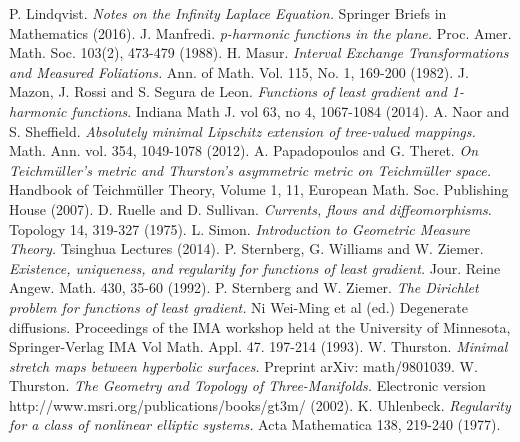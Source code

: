 \documentclass{ip-journal}
\theoremstyle{definition}
\numberwithin{equation}{section}
\begin{document}
\begin{thebibliography}{ABC}
 P. Lindqvist. {\it Notes on the Infinity Laplace Equation.} Springer Briefs in Mathematics (2016).
 J. Manfredi. {\it p-harmonic functions in the plane.} Proc. Amer. Math. Soc. 103(2), 473-479 (1988).
 H. Masur. {\it Interval Exchange Transformations and Measured Foliations.} Ann. of Math. Vol. 115, No. 1,  169-200 (1982).
 J. Mazon, J. Rossi and S. Segura de Leon. {\it Functions of least gradient and 1-harmonic functions}. Indiana Math J. vol 63, no 4, 1067-1084 (2014).
 A. Naor and S. Sheffield. {\it Absolutely minimal Lipschitz extension of tree-valued mappings.} Math. Ann. vol. 354, 1049-1078 (2012).
 A. Papadopoulos and G. Theret. {\it On Teichm\"uller's metric and Thurston's asymmetric metric on Teichm\"uller space.}  Handbook of Teichm\"uller Theory, Volume 1, 11, European Math. Soc. Publishing House (2007).
 D. Ruelle and D. Sullivan. {\it Currents, flows and diffeomorphisms}. Topology 14, 319-327 (1975).
 L. Simon. {\it Introduction to Geometric Measure Theory.} Tsinghua Lectures (2014).
 P. Sternberg, G. Williams and W. Ziemer. {\it Existence, uniqueness, and regularity for functions of least gradient.}  Jour. Reine Angew. Math. 430, 35-60 (1992).
 P. Sternberg and W. Ziemer. {\it The Dirichlet problem for functions of least gradient.} Ni Wei-Ming et al (ed.) Degenerate diffusions. Proceedings of the IMA workshop held at the University of Minnesota, Springer-Verlag IMA Vol Math. Appl. 47.  197-214 (1993).
 W. Thurston. {\it Minimal stretch maps between hyperbolic surfaces.} Preprint arXiv: math/9801039.
 W. Thurston. {\it The Geometry and Topology of Three-Manifolds.}  Electronic version  http://www.msri.org/publications/books/gt3m/ (2002).
 K. Uhlenbeck. {\it {Regularity for a class of nonlinear elliptic systems.}} Acta Mathematica 138, 219-240 (1977).
\end{thebibliography}
\end{document}
